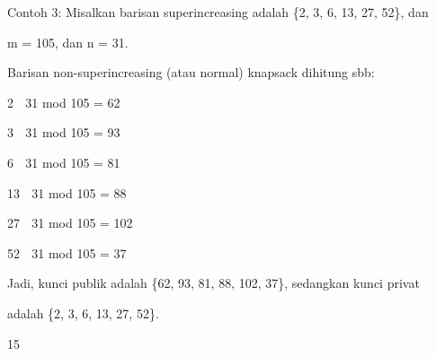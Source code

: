 \documentclass{article}
\begin{document}

Contoh 3: Misalkan barisan superincreasing adalah \{2, 3, 6, 13, 27, 52\}, dan 

m = 105, dan n = 31.

 Barisan non-superincreasing (atau normal) knapsack dihitung sbb:


2  31 mod 105 = 62


3  31 mod 105 = 93


6  31 mod 105 = 81


13  31 mod 105 = 88


27  31 mod 105 = 102


52  31 mod 105 = 37

 Jadi, kunci publik adalah \{62, 93, 81, 88, 102, 37\}, sedangkan kunci privat 

adalah \{2, 3, 6, 13, 27, 52\}.

15
\end{document}
